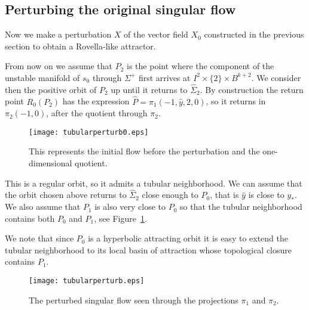 \documentclass[reqno,12pt,a4paper]{amsart}
\theoremstyle{plain}
\theoremstyle{definition}
\begin{document}
\subsection{Perturbing the original singular flow}
\label{sec:pert_flow}

Now we make a  perturbation $X$ of the vector field $X_0$
constructed in the previous section to obtain a Rovella-like
attractor.

From now on we assume that $P_2$ is the point where the
component of the unstable manifold of $s_0$ through
$\Sigma^+$ first arrives at $I^2\times\{2\}\times B^{k+2}$.
We consider then the positive orbit of $P_2$ up until it returns to
$\hat\Sigma_2$.  By construction the return point $R_0(P_2)$
has the expression $\hat P=\pi_1(-1,\hat y,2,0)$, so it
returns in $\pi_2(-1,0)$, after the quotient through
$\pi_2$.

\begin{figure}[htpb]
  \centering
  \texttt{[image: tubularperturb0.eps]}
  \caption{\label{fig:beforeperturb} This represents the
    initial flow before the perturbation and the
    one-dimensional quotient.}
\end{figure}

This is a regular orbit, so it admits a tubular
neighborhood. We can assume that the orbit chosen above
returns to $\hat\Sigma_2$ close enough to $P_0$, that is $\hat
y$ is close to $y_*$. We also assume that $P_1$ is also very
close to $P_0$ so that the tubular neighborhood contains
both $P_0$ and $P_1$, see
Figure~\ref{fig:beforeperturb}.

We note that since $P_0$ is a hyperbolic attracting orbit it
is easy to extend the tubular neighborhood to its local
basin of attraction whose topological closure contains
$P_1$.

\begin{figure}[htbp]
\begin{center}
  \texttt{[image: tubularperturb.eps]}
\end{center}
\caption{The perturbed singular flow seen through the
  projections $\pi_1$ and $\pi_2$.}
  \label{fig:tubularperturb}
\end{figure}
\end{document}
